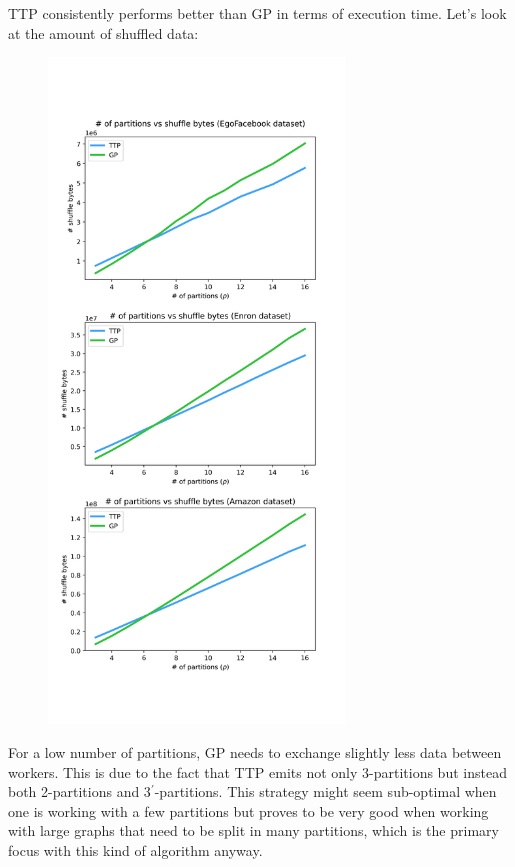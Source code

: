 \documentclass[paper=a4, fontsize=11pt]{scrartcl}
\begin{document}
TTP consistently performs better than GP in terms of execution time. Let's look
at the amount of shuffled data:

\begin{figure}[H]
    \centering
    \includegraphics[width=0.7\textwidth,trim={0 2.8cm 0 3cm},clip]{img/vs_gp_data}
\end{figure}

For a low number of partitions, GP needs to exchange slightly less data between
workers. This is due to the fact that TTP emits not only 3-partitions but
instead both 2-partitions and 3$^\prime$-partitions. This strategy might seem
sub-optimal when one is working with a few partitions but proves to be very good
when working with large graphs that need to be split in many partitions, which
is the primary focus with this kind of algorithm anyway.
\end{document}
